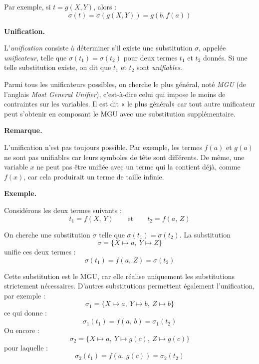 \documentclass[11pt]{article}
\newenvironment{remarque}{%
    \begin{mdframed}[
        linecolor=sectioncolor!40,
        linewidth=0.8pt,
        backgroundcolor=sectioncolor!5,
        innerleftmargin=10pt,
        innerrightmargin=10pt,
        innertopmargin=6pt,
        innerbottommargin=6pt,
        skipabove=8pt,
        skipbelow=8pt
    ]
    \noindent\textbf{\small\color{sectioncolor}Remarque.}\enspace\small\itshape
}{%
    \end{mdframed}
}
\begin{document}
\vspace{0.2cm}
Par exemple, si $t = g(X, Y)$, alors :
\[
    \sigma(t) = \sigma(g(X, Y)) = g(b, f(a))
\]

\vspace{0.4cm}
\noindent\textbf{Unification.}
\vspace{0.2cm}

L'\textit{unification} consiste à déterminer s'il existe une substitution $\sigma$, appelée \textit{unificateur}, telle que $\sigma(t_1) = \sigma(t_2)$ pour deux termes $t_1$ et $t_2$ donnés. Si une telle substitution existe, on dit que $t_1$ et $t_2$ sont \textit{unifiables}.

\vspace{0.2cm}
Parmi tous les unificateurs possibles, on cherche le plus général, noté \textit{MGU} (de l'anglais \textit{Most General Unifier}), c'est-à-dire celui qui impose le moins de contraintes sur les variables. Il est dit « le plus général» car tout autre unificateur peut s'obtenir en composant le MGU avec une substitution supplémentaire.

\begin{remarque}
    L'unification n'est pas toujours possible. Par exemple, les termes $f(a)$ et $g(a)$ ne sont pas unifiables car leurs symboles de tête sont différents. De même, une variable $x$ ne peut pas être unifiée avec un terme qui la contient déjà, comme $f(x)$, car cela produirait un terme de taille infinie.
\end{remarque}

\vspace{0.4cm}
\noindent\textbf{Exemple.}
\vspace{0.2cm}

Considérons les deux termes suivants :
\[
    t_1 = f(X,\, Y) \qquad \text{et} \qquad t_2 = f(a,\, Z)
\]

On cherche une substitution $\sigma$ telle que $\sigma(t_1)=\sigma(t_2)$.
La substitution
\[
    \sigma = \{X \mapsto a,\ Y \mapsto Z\}
\]
unifie ces deux termes :
\[
    \sigma(t_1)=f(a,\, Z)=\sigma(t_2)
\]

Cette substitution est le MGU, car elle réalise uniquement les substitutions strictement nécessaires.
D’autres substitutions permettent également l’unification, par exemple :
\[
    \sigma_1 = \{X \mapsto a,\ Y \mapsto b,\ Z \mapsto b\}
\]
ce qui donne :
\[
    \sigma_1(t_1)=f(a,\, b)=\sigma_1(t_2)
\]
Ou encore :
\[
    \sigma_2 = \{X \mapsto a,\ Y \mapsto g(c),\ Z \mapsto g(c)\}
\]
pour laquelle :
\[
    \sigma_2(t_1)=f(a,\, g(c))=\sigma_2(t_2)
\]
\end{document}
